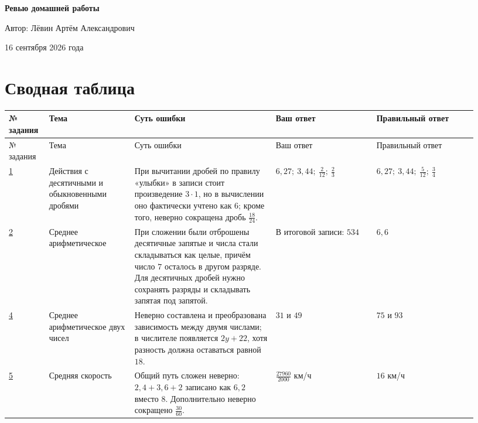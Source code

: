 \documentclass[12pt,a4paper]{article}
\begin{document}
\begin{titlepage}
\centering
\vspace*{0.22\textheight}
{\LARGE\bfseries Ревью домашней работы\par}
\vspace{2.2cm}
{\large Автор: Лёвин Артём Александрович\par}
\vspace{0.8cm}
{\large 16 сентября 2026 года\par}
\vfill
{}
\end{titlepage}

\newpage
\section*{Сводная таблица}
\small
\setlength{\tabcolsep}{3pt}
\begin{longtable}{@{}>{\centering\arraybackslash}p{0.07\linewidth}p{0.17\linewidth}p{0.29\linewidth}p{0.20\linewidth}p{0.20\linewidth}@{}}
\toprule
№ задания & Тема & Суть ошибки & Ваш ответ & Правильный ответ \\
\midrule
\endfirsthead
\toprule
№ задания & Тема & Суть ошибки & Ваш ответ & Правильный ответ \\
\midrule
\endhead
\hyperref[task:1]{1} & Действия с десятичными и обыкновенными дробями &
При вычитании дробей по правилу «улыбки» в записи стоит произведение $3\cdot1$, но в вычислении оно фактически учтено как $6$; кроме того, неверно сокращена дробь $\frac{18}{24}$. &
$6{,}27;\ 3{,}44;\ \frac{2}{12};\ \frac{2}{3}$ &
$6{,}27;\ 3{,}44;\ \frac{5}{12};\ \frac{3}{4}$ \\
\addlinespace
\hyperref[task:2]{2} & Среднее арифметическое &
При сложении были отброшены десятичные запятые и числа стали складываться как целые, причём число $7$ осталось в другом разряде. Для десятичных дробей нужно сохранять разряды и складывать запятая под запятой. &
В итоговой записи: $534$ &
$6{,}6$ \\
\addlinespace
\hyperref[task:4]{4} & Среднее арифметическое двух чисел &
Неверно составлена и преобразована зависимость между двумя числами; в числителе появляется $2y+22$, хотя разность должна оставаться равной $18$. &
$31$ и $49$ &
$75$ и $93$ \\
\addlinespace
\hyperref[task:5]{5} & Средняя скорость &
Общий путь сложен неверно: $2{,}4+3{,}6+2$ записано как $6{,}2$ вместо $8$. Дополнительно неверно сокращено $\frac{30}{60}$. &
$\frac{27960}{2000}$ км/ч &
$16$ км/ч \\
\bottomrule
\end{longtable}
\normalsize
\end{document}
